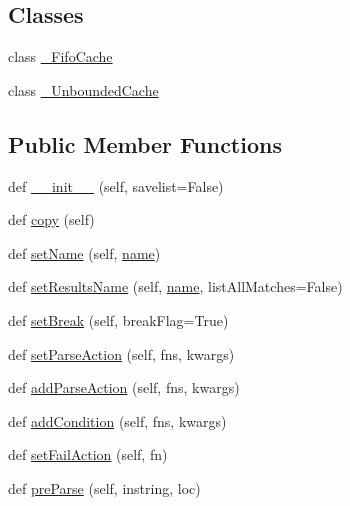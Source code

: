 \subsection*{Classes}
\begin{DoxyCompactItemize}
\item 
class \hyperlink{classpyparsing_1_1ParserElement_1_1__FifoCache}{\+\_\+\+Fifo\+Cache}
\item 
class \hyperlink{classpyparsing_1_1ParserElement_1_1__UnboundedCache}{\+\_\+\+Unbounded\+Cache}
\end{DoxyCompactItemize}
\subsection*{Public Member Functions}
\begin{DoxyCompactItemize}
\item 
def \hyperlink{classpyparsing_1_1ParserElement_af2b1ea2e6dddf5043eb401bfaf114463}{\+\_\+\+\_\+init\+\_\+\+\_\+} (self, savelist=False)
\item 
def \hyperlink{classpyparsing_1_1ParserElement_a1fc11c0465d31bf37eb92f7a5cd8c6a4}{copy} (self)
\item 
def \hyperlink{classpyparsing_1_1ParserElement_a8197a4fff4f269747bb21028452a3755}{set\+Name} (self, \hyperlink{classpyparsing_1_1ParserElement_ab51381d24c5bc721b4a4764af8d9b470}{name})
\item 
def \hyperlink{classpyparsing_1_1ParserElement_a4996c883b285fef6c89b2b5caf675fd0}{set\+Results\+Name} (self, \hyperlink{classpyparsing_1_1ParserElement_ab51381d24c5bc721b4a4764af8d9b470}{name}, list\+All\+Matches=False)
\item 
def \hyperlink{classpyparsing_1_1ParserElement_a078b62d7a0d94fdb5755c196347022ab}{set\+Break} (self, break\+Flag=True)
\item 
def \hyperlink{classpyparsing_1_1ParserElement_ad19e8d671046a66846d01f0604618f97}{set\+Parse\+Action} (self, fns, kwargs)
\item 
def \hyperlink{classpyparsing_1_1ParserElement_a21f4bd9d7b1c9e8c18b94e4f8d2b1951}{add\+Parse\+Action} (self, fns, kwargs)
\item 
def \hyperlink{classpyparsing_1_1ParserElement_a9fce1e8f3c0c4693eb5cd60223b0a5fc}{add\+Condition} (self, fns, kwargs)
\item 
def \hyperlink{classpyparsing_1_1ParserElement_a38989383d034cbd8b3723141d1c43ffd}{set\+Fail\+Action} (self, fn)
\item 
def \hyperlink{classpyparsing_1_1ParserElement_ac97092fcb02cd6696f51185cfceeac59}{pre\+Parse} (self, instring, loc)

\end{DoxyCompactItemize}
